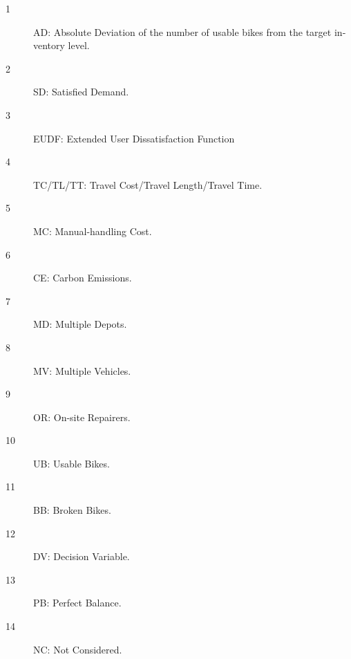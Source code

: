 \documentclass[
  english,
]{article}
\begin{document}
\begin{otherlanguage}{english}
\begin{description}
\item[1]
\protect{}\label{np005}
AD: Absolute Deviation of the number of usable bikes from the target inventory level.
\item[2]
\protect{}\label{np010}
SD: Satisfied Demand.
\item[3]
\protect{}\label{np015}
EUDF: Extended User Dissatisfaction Function
\item[4]
\protect{}\label{np020}
TC/TL/TT: Travel Cost/Travel Length/Travel Time.
\item[5]
\protect{}\label{np025}
MC: Manual-handling Cost.
\item[6]
\protect{}\label{np030}
CE: Carbon Emissions.
\item[7]
\protect{}\label{np035}
MD: Multiple Depots.
\item[8]
\protect{}\label{np040}
MV: Multiple Vehicles.
\item[9]
\protect{}\label{np045}
OR: On-site Repairers.
\item[10]
\protect{}\label{np050}
UB: Usable Bikes.
\item[11]
\protect{}\label{np055}
BB: Broken Bikes.
\item[12]
\protect{}\label{np060}
DV: Decision Variable.
\item[13]
\protect{}\label{np065}
PB: Perfect Balance.
\item[14]
\protect{}\label{np070}
NC: Not Considered.
\end{description}


\end{otherlanguage}
\end{document}
